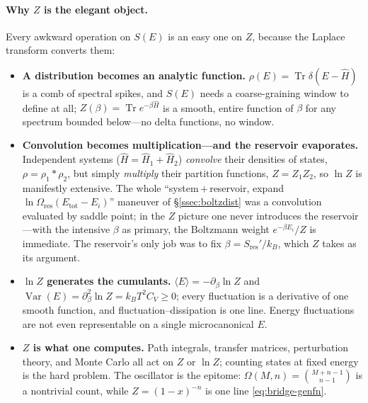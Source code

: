 \documentclass[11pt,a4paper]{article}
\theoremstyle{definition}
\begin{document}
\paragraph{Why $Z$ is the elegant object.} Every awkward operation on $S(E)$ is
an easy one on $Z$, because the Laplace transform converts them:
\begin{itemize}
\item \textbf{A distribution becomes an analytic function.}
$\rho(E)=\operatorname{Tr}\delta(E-\hat H)$ is a comb of spectral spikes, and
$S(E)$ needs a coarse-graining window to define at all; $Z(\beta)=\operatorname{Tr}
e^{-\beta\hat H}$ is a smooth, entire function of $\beta$ for any spectrum bounded
below---no delta functions, no window.
\item \textbf{Convolution becomes multiplication---and the reservoir evaporates.}
Independent systems ($\hat H=\hat H_1+\hat H_2$) \emph{convolve} their densities
of states, $\rho=\rho_1\!*\rho_2$, but simply \emph{multiply} their
partition functions, $Z=Z_1Z_2$, so $\ln Z$ is manifestly extensive. The whole
``system\,$+$\,reservoir, expand $\ln\Omega_{\mathrm{res}}(E_{\mathrm{tot}}-E_i)$''
maneuver of \S\ref{ssec:boltzdist} was a convolution evaluated by saddle point;
in the $Z$ picture one never introduces the reservoir---with the intensive
$\beta$ as primary, the Boltzmann weight $e^{-\beta E_i}/Z$ is immediate. The
reservoir's only job was to fix $\beta=S_{\mathrm{res}}'/k_B$, which $Z$ takes as
its argument.
\item \textbf{$\ln Z$ generates the cumulants.} $\langle E\rangle=-\partial_\beta
\ln Z$ and $\operatorname{Var}(E)=\partial_\beta^{2}\ln Z=k_BT^{2}C_V\ge0$; every
fluctuation is a derivative of one smooth function, and fluctuation--dissipation
is one line. Energy fluctuations are not even representable on a single
microcanonical $E$.
\item \textbf{$Z$ is what one computes.} Path integrals, transfer matrices,
perturbation theory, and Monte Carlo all act on $Z$ or $\ln Z$; counting states
at fixed energy is the hard problem. The oscillator is the epitome:
$\Omega(M,n)=\binom{M+n-1}{n-1}$ is a nontrivial count, while $Z=(1-x)^{-n}$ is
one line \eqref{eq:bridge-genfn}.
\end{itemize}
\end{document}
